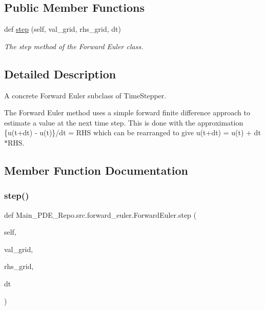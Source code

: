 \subsection*{Public Member Functions}
\begin{DoxyCompactItemize}
\item 
def \hyperlink{classMain__PDE__Repo_1_1src_1_1forward__euler_1_1ForwardEuler_aafec83c8cc54107baf7aa842563199b0}{step} (self, val\+\_\+grid, rhs\+\_\+grid, dt)
\begin{DoxyCompactList}\small\item\em The step method of the Forward Euler class. \end{DoxyCompactList}\end{DoxyCompactItemize}


\subsection{Detailed Description}
A concrete Forward Euler subclass of Time\+Stepper. 

The Forward Euler method uses a simple forward finite difference approach to estimate a value at the next time step. This is done with the approximation \{u(t+dt) -\/ u(t)\}/dt = R\+HS which can be rearranged to give u(t+dt) = u(t) + dt$\ast$\+R\+HS. 

\subsection{Member Function Documentation}
\mbox{\label{classMain__PDE__Repo_1_1src_1_1forward__euler_1_1ForwardEuler_aafec83c8cc54107baf7aa842563199b0}} 
\subsubsection{\texorpdfstring{step()}{step()}}
{\footnotesize\ttfamily def Main\+\_\+\+P\+D\+E\+\_\+\+Repo.\+src.\+forward\+\_\+euler.\+Forward\+Euler.\+step (\begin{DoxyParamCaption}\item[{}]{self,  }\item[{}]{val\+\_\+grid,  }\item[{}]{rhs\+\_\+grid,  }\item[{}]{dt }\end{DoxyParamCaption})}



